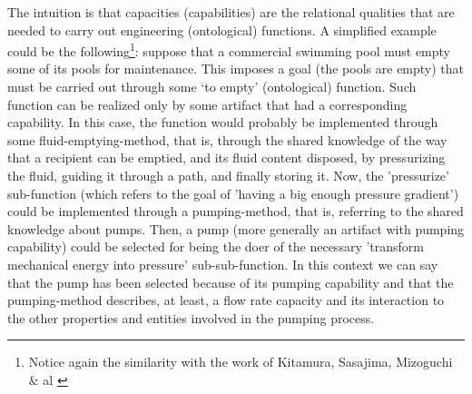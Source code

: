 \documentclass[sw]{iosart2x}
\newcommand{\firstTimeKeyWord}[1]{\textit{#1}}
\begin{document}
The intuition is that capacities (capabilities) are the relational qualities that are needed to carry out engineering (ontological) functions.
A simplified example could be the following\footnote{Notice again the similarity with the work of Kitamura, Sasajima, Mizoguchi \& al \cite{kitamuraOntologybasedDescriptionFunctional2003}}: suppose that a commercial swimming pool must empty some of its pools for maintenance. This imposes a goal (the pools are empty) that must be carried out through some `to empty' (ontological) function. Such function can be realized only by some artifact that had a corresponding capability. In this case, the function would probably be implemented through some fluid-emptying-method, that is, through the shared knowledge of the way that a recipient can be emptied, and its fluid content disposed, by pressurizing the fluid, guiding it through a path, and finally storing it.
Now, the 'pressurize' sub-function (which refers to the goal of 'having a big enough pressure gradient') could be implemented through a pumping-method, that is, referring to the shared knowledge about pumps.
Then, a pump (more generally an artifact with pumping capability) could be selected for being the doer of the necessary 'transform mechanical energy into pressure' sub-sub-function.
In this context we can say that the pump has been selected because of its pumping capability and that the pumping-method describes, at least, a flow rate capacity and its interaction to the other properties and entities involved in the pumping process. 






\end{document}
